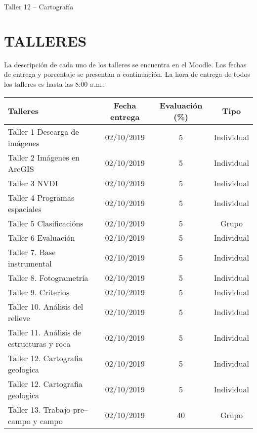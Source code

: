 \documentclass[a4paper,twoside,11pt,]{article}
\begin{document}
\begin{tcolorbox}[enhanced,width=5in,center upper,  fontupper=\large\bfseries,drop shadow southwest,sharp corners]
Taller 12 -- Cartografía
\end{tcolorbox}

\section{TALLERES}
La descripción de cada uno de los talleres se encuentra en el Moodle. Las fechas de entrega y porcentaje se presentan a continuación. La hora de entrega de todos los talleres es hasta las 8:00 a.m.:\\
\begin{table}[!hbt]
\label{tab-marks}
\begin{tabular}{|l|c|c|c|}
\hline {\bf Talleres} & {\bf Fecha entrega} & {\bf Evaluación (\%)} & {\bf Tipo} \\
\hline Taller 1 Descarga de imágenes & 02/10/2019 &  5 & Individual\\
\hline Taller 2 Imágenes en ArcGIS &  02/10/2019& 5 & Individual\\
\hline Taller 3 NVDI & 02/10/2019  & 5 & Individual\\
\hline Taller 4 Programas espaciales  & 02/10/2019 &  5 & Individual\\
\hline Taller 5 Clasificacións &  02/10/2019& 5 & Grupo\\
\hline Taller 6 Evaluación & 02/10/2019  & 5 & Individual\\
\hline Taller 7. Base instrumental & 02/10/2019 &  5 & Individual\\
\hline Taller 8. Fotogrametría &  02/10/2019& 5 & Individual\\
\hline Taller 9. Criterios  & 02/10/2019  & 5 & Individual\\
\hline Taller 10. Análisis del relieve  & 02/10/2019 &  5 & Individual\\
\hline Taller 11. Análisis de estructuras y roca &  02/10/2019& 5 & Individual\\
\hline Taller 12. Cartografia geologica & 02/10/2019  & 5 & Individual\\
\hline Taller 12. Cartografia geologica & 02/10/2019  & 5 & Individual\\
\hline Taller 13. Trabajo pre--campo y campo & 02/10/2019  & 40 & Grupo\\
\hline
\end{tabular}
\end{table}
\end{document}
